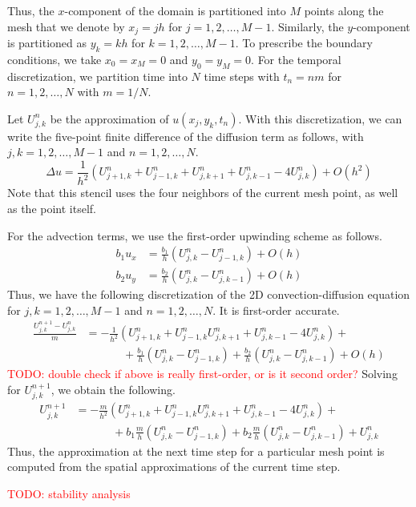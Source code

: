 \documentclass[12pt, letterpaper]{article}
\newcommand\todo[1]{\textcolor{red}{#1}}
\begin{document}

Thus, the $x$-component of the domain is partitioned into $M$ points along the mesh that we denote by $x_j = jh$ for $j = 1, 2, \ldots, M-1$. Similarly, the $y$-component is partitioned as $y_k = kh$ for $k = 1, 2, \ldots, M-1$. To prescribe the boundary conditions, we take $x_0 = x_M = 0$ and $y_0 = y_M = 0$. For the temporal discretization, we partition time into $N$ time steps with $t_n = nm$ for $n = 1, 2, \ldots, N$ with $m = 1/N$.

Let $U^{n}_{j,k}$ be the approximation of $u(x_j,y_k,t_n)$. With this discretization, we can write the five-point finite difference of the diffusion term as follows, with $j,k = 1, 2, \ldots, M-1$ and $n = 1, 2, \ldots, N$.
\[
\Delta u = \frac{1}{h^2}\left( U^{n}_{j+1,k} + U^{n}_{j-1,k} + U^{n}_{j,k+1} + U^{n}_{j,k-1} - 4U^{n}_{j,k}\right) + O(h^2)
\]
Note that this stencil uses the four neighbors of the current mesh point, as well as the point itself.

For the advection terms, we use the first-order upwinding scheme as follows.
\begin{align*}
b_1u_x &= \frac{b_1}{h}\left(U^{n}_{j,k} - U^{n}_{j-1,k}\right) + O(h) \\
b_2u_y &= \frac{b_2}{h}\left(U^{n}_{j,k} - U^{n}_{j,k-1}\right) + O(h)
\end{align*}
Thus, we have the following discretization of the 2D convection-diffusion equation for $j,k = 1, 2, \ldots, M-1$ and $n = 1, 2, \ldots, N$. It is first-order accurate.
\begin{align*}
\frac{U^{n+1}_{j,k} - U^{n}_{j,k}}{m} &= -\frac{1}{h^2}\left( U^{n}_{j+1,k} + U^{n}_{j-1,k}  U^{n}_{j,k+1} + U^{n}_{j,k-1} - 4U^{n}_{j,k}\right) + \\
&~~~~~~~~~~~~~~~+\frac{b_1}{h}\left(U^{n}_{j,k} - U^{n}_{j-1,k}\right) + \frac{b_2}{h}\left(U^{n}_{j,k} - U^{n}_{j,k-1}\right) + O(h)
\end{align*}
\todo{TODO: double check if above is really first-order, or is it second order?} Solving for $U^{n+1}_{j,k}$, we obtain the following.
\begin{align*}
U^{n+1}_{j,k} &= -\frac{m}{h^2}\left( U^{n}_{j+1,k} + U^{n}_{j-1,k}  U^{n}_{j,k+1} + U^{n}_{j,k-1} - 4U^{n}_{j,k}\right) + \\
&~~~~~~~~~~~~~~~+b_1\frac{m}{h}\left(U^{n}_{j,k} - U^{n}_{j-1,k}\right) + b_2\frac{m}{h}\left(U^{n}_{j,k} - U^{n}_{j,k-1}\right) + U^{n}_{j,k}
\end{align*}
Thus, the approximation at the next time step for a particular mesh point is computed from the spatial approximations of the current time step.

\todo{TODO: stability analysis}
\end{document}
